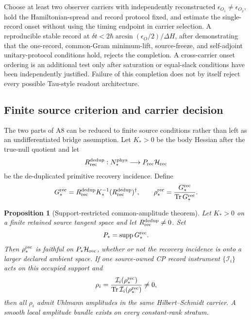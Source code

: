 \documentclass[11pt]{article}
\newtheorem{proposition}{Proposition}
\begin{document}
Choose at least two observer carriers with independently reconstructed
\(\epsilon_{O_1}\neq\epsilon_{O_2}\), hold the Hamiltonian-spread and record
protocol fixed, and estimate the single-record onset without using the timing
endpoint in carrier selection.  A reproducible stable record at
\(\delta t<2\hbar\arcsin(\epsilon_O/2)/\Delta H\), after demonstrating that
the one-record, common-Gram minimum-lift, source-freeze, and self-adjoint
unitary-protocol conditions hold, rejects the completion.  A
cross-carrier onset ordering is an additional test only after saturation or
equal-slack conditions have been independently justified.  Failure of this
completion does not by itself reject every possible Tau-style readout
architecture.

\subsection{Finite source criterion and carrier decision}
\label{sec:a8-source-carrier}

The two parts of A8 can be reduced to finite source conditions rather than
left as an undifferentiated bridge assumption.  Let \(K_*>0\) be the body
Hessian after the true-null quotient and let
\[
 R_{\rm rec}^{\rm dedup}:N_*^{\rm phys}\longrightarrow
 P_{\rm rec}\mathcal H_{\rm rec}
\]
be the de-duplicated primitive recovery incidence.  Define
\begin{equation}
 G_*^{\rm rec}
 =R_{\rm rec}^{\rm dedup}K_*^{-1}
 (R_{\rm rec}^{\rm dedup})^\dagger,
 \qquad
 \rho_*^{\rm rec}
 ={G_*^{\rm rec}\over\operatorname{Tr}G_*^{\rm rec}}.
 \label{eq:a8-faithful-source-state}
\end{equation}

\begin{proposition}[Support-restricted common-amplitude theorem]
Let \(K_*>0\) on a finite retained source tangent space and let
\(R_{\rm rec}^{\rm dedup}\ne0\).  Set
\begin{equation}
 P_*=\operatorname{supp}G_*^{\rm rec}.
 \label{eq:a8-occupied-support}
\end{equation}
Then \(\rho_*^{\rm rec}\) is faithful on
\(P_*\mathcal H_{\rm rec}\), whether or not the recovery incidence is onto a
larger declared ambient space.  If one source-owned CP record instrument
\(\{\mathcal I_i\}\) acts on this occupied support and
\begin{equation}
 \rho_i={\mathcal I_i(\rho_*^{\rm rec})\over
 \operatorname{Tr}\mathcal I_i(\rho_*^{\rm rec})}\ne0,
 \label{eq:a8-record-instrument}
\end{equation}
then all \(\rho_i\) admit Uhlmann amplitudes in the same
Hilbert--Schmidt carrier.  A smooth local amplitude bundle exists on every
constant-rank stratum.
\end{proposition}
\end{document}
